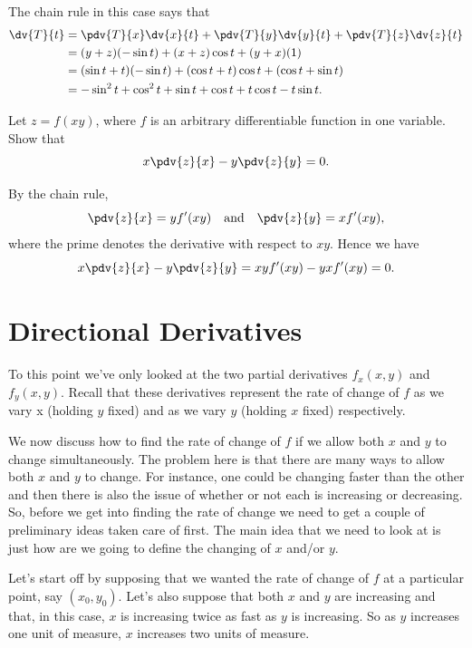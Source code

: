 \begin{solution}
The chain rule in this case says that
\begin{align*}
\dv{T}{t} &= \pdv{T}{x}\dv{x}{t}+\pdv{T}{y}\dv{y}{t}+\pdv{T}{z}\dv{z}{t} \\
&= (y+z)(-\sin t)+(x+z)\cos t+(y+x)(1) \\
&= (\sin t+t)(-\sin t)+(\cos t+t)\cos t+(\cos t+\sin t) \\
&= -\sin^2t+\cos^2t+\sin t+\cos t+t\cos t-t\sin t.
\end{align*}
\end{solution}

\begin{exercise}{}{}
Let $z=f(xy)$, where $f$ is an arbitrary differentiable function in one variable. Show that
\[ x\pdv{z}{x}-y\pdv{z}{y}=0. \]
\end{exercise}

\begin{solution}
By the chain rule,
\[ \pdv{z}{x}=yf^\prime(xy) \quad \text{and} \quad \pdv{z}{y}=xf^\prime(xy), \]
where the prime denotes the derivative with respect to $xy$. Hence we have
\[ x\pdv{z}{x}-y\pdv{z}{y}=xyf^\prime(xy)-yxf^\prime(xy)=0. \]
\end{solution}

\section{Directional Derivatives}
To this point we've only looked at the two partial derivatives $f_x(x,y)$ and $f_y(x,y)$. Recall that these derivatives represent the rate of change of $f$ as we vary x (holding $y$ fixed) and as we vary $y$ (holding $x$ fixed) respectively. 

We now discuss how to find the rate of change of $f$ if we allow both $x$ and $y$ to change simultaneously. The problem here is that there are many ways to allow both $x$ and $y$ to change. For instance, one could be changing faster than the other and then there is also the issue of whether or not each is increasing or decreasing. So, before we get into finding the rate of change we need to get a couple of preliminary ideas taken care of first. The main idea that we need to look at is just how are we going to define the changing of $x$ and/or $y$.

Let's start off by supposing that we wanted the rate of change of $f$ at a particular point, say $(x_0,y_0)$. Let's also suppose that both $x$ and $y$ are increasing and that, in this case, $x$ is increasing twice as fast as $y$ is increasing. So as $y$ increases one unit of measure, $x$ increases two units of measure.

